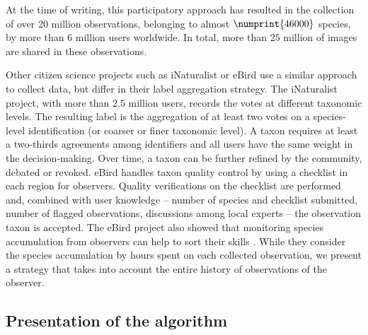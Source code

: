 At the time of writing, this participatory approach has resulted in the collection of over 20 million observations, belonging to almost $\numprint{46000}$ species, by more than 6 million users worldwide. In total, more than $25$ million of images are shared in these observations.

Other citizen science projects such as iNaturalist \citep{van2018inaturalist} or eBird \citep{sullivan2009ebird} use a similar approach to collect data, but differ in their label aggregation strategy.
The iNaturalist project, with more than $2.5$ million users, records the votes at different taxonomic levels.
The resulting label is the aggregation of at least two votes on a species-level identification (or coarser or finer taxonomic level).
A taxon requires at least a two-thirds agreements among identifiers and all users have the same weight in the decision-making.
Over time, a taxon can be further refined by the community, debated or revoked.
eBird handles taxon quality control by using a checklist in each region for observers.
Quality verifications on the checklist are performed and, combined with user knowledge -- number of species and checklist submitted, number of flagged observations, discussions among local experts -- the observation taxon is accepted.
The eBird project also showed that monitoring species accumulation from observers can help to sort their skills \citep{kelling2015}. While they consider the species accumulation by hours spent on each collected observation, we present a strategy that takes into account the entire history of observations of the observer.


\subsection{Presentation of the algorithm}
\label{sub:algo_plantnet}

